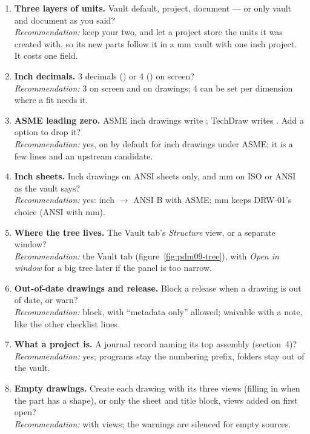 \begin{enumerate}
  \item \textbf{Three layers of units.} Vault default, project, document --- or only vault and document as you said?\\
        \emph{Recommendation:} keep your two, and let a project store the units it was created with, so its new parts
        follow it in a mm vault with one inch project. It costs one field.
  \item \textbf{Inch decimals.} 3 decimals () or 4 () on screen?\\
        \emph{Recommendation:} 3 on screen and on drawings; 4 can be set per dimension where a fit needs it.
  \item \textbf{ASME leading zero.} ASME inch drawings write ; TechDraw writes . Add a \code{[BW]}
        option to drop it?\\
        \emph{Recommendation:} yes, on by default for inch drawings under ASME; it is a few lines and an upstream
        candidate.
  \item \textbf{Inch sheets.} Inch drawings on ANSI sheets only, and mm on ISO or ANSI as the vault says?\\
        \emph{Recommendation:} yes: inch $\rightarrow$ ANSI B with ASME; mm keeps DRW-01's choice (ANSI with mm).
  \item \textbf{Where the tree lives.} The Vault tab's \emph{Structure} view, or a separate window?\\
        \emph{Recommendation:} the Vault tab (figure~\ref{fig:pdm09-tree}), with \emph{Open in window} for a big tree
        later if the panel is too narrow.
  \item \textbf{Out-of-date drawings and release.} Block a release when a drawing is out of date, or warn?\\
        \emph{Recommendation:} block, with ``metadata only'' allowed; waivable with a note, like the other checklist
        lines.
  \item \textbf{What a project is.} A journal record naming its top assembly (section~4)?\\
        \emph{Recommendation:} yes; programs stay the numbering prefix, folders stay out of the vault.
  \item \textbf{Empty drawings.} Create each drawing with its three views (filling in when the part has a shape), or
        only the sheet and title block, views added on first open?\\
        \emph{Recommendation:} with views; the warnings are silenced for empty sources.

\end{enumerate}
